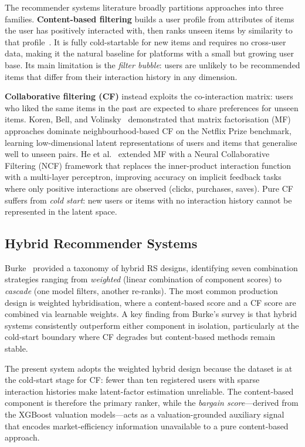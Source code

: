 The recommender systems literature broadly partitions approaches into three families.
\textbf{Content-based filtering} builds a user profile from attributes of items the user
has positively interacted with, then ranks unseen items by similarity to that
profile~\cite{ricci2011introduction}. It is fully cold-startable for new items and
requires no cross-user data, making it the natural baseline for platforms with a small
but growing user base. Its main limitation is the \textit{filter bubble}: users are
unlikely to be recommended items that differ from their interaction history in any
dimension.

\textbf{Collaborative filtering (CF)} instead exploits the co-interaction matrix: users
who liked the same items in the past are expected to share preferences for unseen
items. Koren, Bell, and Volinsky~\cite{koren2009matrix} demonstrated that matrix
factorisation (MF) approaches dominate neighbourhood-based CF on the Netflix Prize
benchmark, learning low-dimensional latent representations of users and items that
generalise well to unseen pairs. He et al.~\cite{he2017neural} extended MF with a
Neural Collaborative Filtering (NCF) framework that replaces the inner-product
interaction function with a multi-layer perceptron, improving accuracy on implicit
feedback tasks where only positive interactions are observed (clicks, purchases,
saves). Pure CF suffers from \textit{cold start}: new users or items with no
interaction history cannot be represented in the latent space.

\subsection{Hybrid Recommender Systems}

Burke~\cite{burke2002hybrid} provided a taxonomy of hybrid RS designs, identifying seven
combination strategies ranging from \textit{weighted} (linear combination of component
scores) to \textit{cascade} (one model filters, another re-ranks). The most common
production design is weighted hybridisation, where a content-based score and a CF score
are combined via learnable weights. A key finding from Burke's survey is that hybrid
systems consistently outperform either component in isolation, particularly at the cold-start
boundary where CF degrades but content-based methods remain stable.

The present system adopts the weighted hybrid design because the dataset is at the
cold-start stage for CF: fewer than ten registered users with sparse interaction histories
make latent-factor estimation unreliable. The content-based component is therefore the
primary ranker, while the \textit{bargain score}---derived from the XGBoost valuation
models---acts as a valuation-grounded auxiliary signal that encodes market-efficiency
information unavailable to a pure content-based approach.

